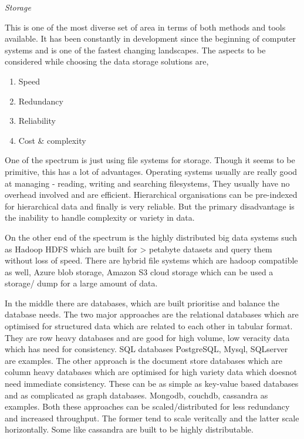 
\vspace{1.5em}\noindent\textit{Storage}\vspace{0.5em}

This is one of the most diverse set of area in terms of both methods and tools available.
It has been constantly in development since the beginning of computer systems and is one of the fastest changing landscapes.
The aspects to be considered while choosing the data storage solutions are,

\begin{enumerate}
    \item Speed
    \item Redundancy
    \item Reliability
    \item Cost \& complexity
\end{enumerate}

One of the spectrum is just using file systems for storage.
Though it seems to be primitive, this has a lot of advantages.
Operating systems usually are really good at managing - reading, writing and searching filesystems, They usually have no overhead involved and are efficient.
Hierarchical organisations can be pre-indexed for hierarchical data and finally is very reliable.
But the primary disadvantage is the inability to handle complexity or variety in data.

On the other end of the spectrum is the highly distributed big data systems such as Hadoop HDFS which are built for > petabyte datasets and query them without loss of speed.
There are hybrid file systems which are hadoop compatible as well, Azure blob storage, Amazon S3 cloud storage which can be used a storage/ dump for a large amount of data.

In the middle there are databases, which are built prioritise and balance the database needs.
The two major approaches are the relational databases which are optimised for structured data which are related to each other in tabular format.
They are row heavy databases and are good for high volume, low veracity data which has need for consistency.
SQL databases PostgreSQL, Mysql, SQLserver are examples.
The other approach is the document store databases which are column heavy databases which are optimised for high variety data which doesnot need immediate consistency.
These can be as simple as key-value based databases and as complicated as graph databases.
Mongodb, couchdb, cassandra as examples.
Both these approaches can be scaled/distributed for less redundancy and increased throughput.
The former tend to scale veritcally and the latter scale horizontally.
Some like cassandra are built to be highly distributable.

